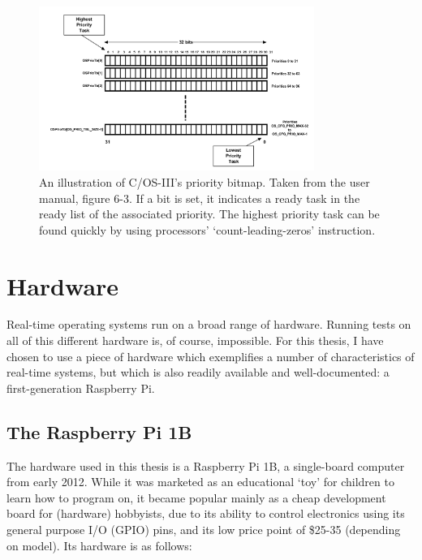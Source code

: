\documentclass[twoside]{uva-inf-bachelor-thesis}
\newcommand{\ucosiii}{\textmu C/OS-III\xspace}
\begin{document}
\begin{figure}[htpb]
    \centering
    \includegraphics[width=0.8\textwidth]{priobitmap.png}
    \caption{An illustration of \ucosiii's priority bitmap. Taken from the user manual, figure 6-3. If a bit is set, it indicates a ready task in the ready list of the associated priority. The highest priority task can be found quickly by using processors' `count-leading-zeros' instruction.}
    \label{fig:priobitmap}
\end{figure}


%
%
%
%

\chapter{Hardware} \label{chp:hardware}
Real-time operating systems run on a broad range of hardware. Running tests on all of this different hardware is, of course, impossible. For this thesis, I have chosen to use a piece of hardware which exemplifies a number of characteristics of real-time systems, but which is also readily available and well-documented: a first-generation Raspberry Pi.

\section{The Raspberry Pi 1B}
The hardware used in this thesis is a Raspberry Pi 1B, a single-board computer from early 2012. While it was marketed as an educational `toy' for children to learn how to program on, it became popular mainly as a cheap development board for (hardware) hobbyists, due to its ability to control electronics using its general purpose I/O (GPIO) pins, and its low price point of \$25-35 (depending on model). Its hardware is as follows:
\end{document}
